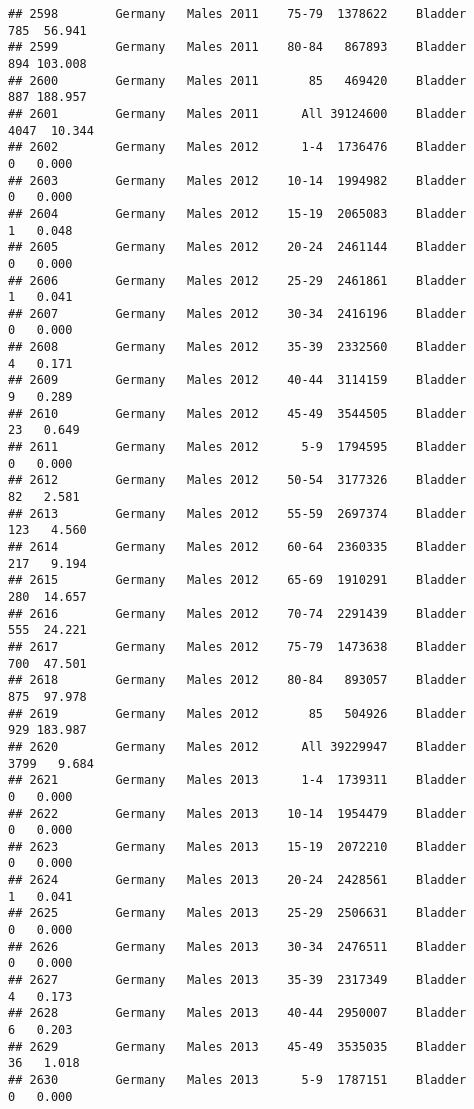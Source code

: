 \documentclass[
]{article}
\begin{document}
\begin{verbatim}
## 2598        Germany   Males 2011    75-79  1378622    Bladder    785  56.941
## 2599        Germany   Males 2011    80-84   867893    Bladder    894 103.008
## 2600        Germany   Males 2011       85   469420    Bladder    887 188.957
## 2601        Germany   Males 2011      All 39124600    Bladder   4047  10.344
## 2602        Germany   Males 2012      1-4  1736476    Bladder      0   0.000
## 2603        Germany   Males 2012    10-14  1994982    Bladder      0   0.000
## 2604        Germany   Males 2012    15-19  2065083    Bladder      1   0.048
## 2605        Germany   Males 2012    20-24  2461144    Bladder      0   0.000
## 2606        Germany   Males 2012    25-29  2461861    Bladder      1   0.041
## 2607        Germany   Males 2012    30-34  2416196    Bladder      0   0.000
## 2608        Germany   Males 2012    35-39  2332560    Bladder      4   0.171
## 2609        Germany   Males 2012    40-44  3114159    Bladder      9   0.289
## 2610        Germany   Males 2012    45-49  3544505    Bladder     23   0.649
## 2611        Germany   Males 2012      5-9  1794595    Bladder      0   0.000
## 2612        Germany   Males 2012    50-54  3177326    Bladder     82   2.581
## 2613        Germany   Males 2012    55-59  2697374    Bladder    123   4.560
## 2614        Germany   Males 2012    60-64  2360335    Bladder    217   9.194
## 2615        Germany   Males 2012    65-69  1910291    Bladder    280  14.657
## 2616        Germany   Males 2012    70-74  2291439    Bladder    555  24.221
## 2617        Germany   Males 2012    75-79  1473638    Bladder    700  47.501
## 2618        Germany   Males 2012    80-84   893057    Bladder    875  97.978
## 2619        Germany   Males 2012       85   504926    Bladder    929 183.987
## 2620        Germany   Males 2012      All 39229947    Bladder   3799   9.684
## 2621        Germany   Males 2013      1-4  1739311    Bladder      0   0.000
## 2622        Germany   Males 2013    10-14  1954479    Bladder      0   0.000
## 2623        Germany   Males 2013    15-19  2072210    Bladder      0   0.000
## 2624        Germany   Males 2013    20-24  2428561    Bladder      1   0.041
## 2625        Germany   Males 2013    25-29  2506631    Bladder      0   0.000
## 2626        Germany   Males 2013    30-34  2476511    Bladder      0   0.000
## 2627        Germany   Males 2013    35-39  2317349    Bladder      4   0.173
## 2628        Germany   Males 2013    40-44  2950007    Bladder      6   0.203
## 2629        Germany   Males 2013    45-49  3535035    Bladder     36   1.018
## 2630        Germany   Males 2013      5-9  1787151    Bladder      0   0.000

\end{verbatim}
\end{document}
